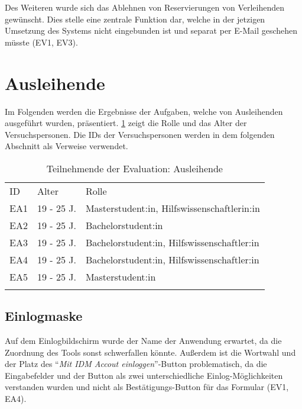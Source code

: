 Des Weiteren wurde sich das Ablehnen von Reservierungen von Verleihenden gewünscht. Dies stelle
eine zentrale Funktion dar, welche in der jetzigen Umsetzung des Systems nicht eingebunden ist und
separat per E-Mail geschehen müsste (EV1, EV3).

\section{Ausleihende}
Im Folgenden werden die Ergebnisse der Aufgaben, welche von Ausleihenden ausgeführt wurden,
präsentiert. \ref{table:azwei} zeigt die Rolle und das Alter der Versuchspersonen. Die IDs der
Versuchspersonen werden in dem folgenden Abschnitt als Verweise verwendet.

\begin{table}[h]
        \centering
        \caption{Teilnehmende der Evaluation: Ausleihende}
        \begin{tabular}{lll}
                \arrayrulecolor{maincolor}\hline
                \sffamily\color{maincolor}ID & \sffamily\color{maincolor}Alter &
                \sffamily\color{maincolor}Rolle                                  \\
                \arrayrulecolor{maincolor}\hline
                EA1                          & 19 - 25 J.                      &
                Masterstudent:in, Hilfswissenschaftlerin:in                      \\
                EA2                          & 19 - 25 J.                      &
                Bachelorstudent:in                                               \\
                EA3                          & 19 - 25 J.                      &
                Bachelorstudent:in, Hilfswissenschaftler:in                      \\
                EA4                          & 19 - 25 J.                      &
                Bachelorstudent:in, Hilfswissenschaftler:in                      \\
                EA5                          & 19 - 25 J.                      &
                Masterstudent:in                                                 \\
                \arrayrulecolor{maincolor}\hline
        \end{tabular}
        \label{table:azwei}
\end{table}

\subsection{Einlogmaske}
Auf dem Einlogbildschirm wurde der Name der Anwendung erwartet, da die
Zuordnung des Tools sonst schwerfallen könnte. Außerdem ist die Wortwahl und der
Platz des \enquote{\textit{Mit IDM Accout einloggen}}-Button problematisch, da die
Eingabefelder und der Button als zwei unterschiedliche Einlog-Möglichkeiten verstanden
wurden und nicht als Bestätigungs-Button für das Formular (EV1, EA4).

